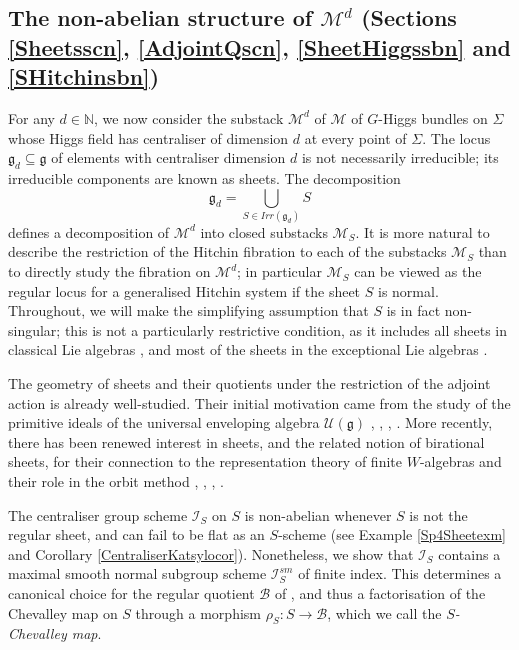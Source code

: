 \documentclass{amsart}
\theoremstyle{remark}
\numberwithin{theorem}{section}
\numberwithin{equation}{section}
\begin{document}
\subsection*{The non-abelian structure of \texorpdfstring{$\mathcal M^d$}{Md} (Sections \ref{Sheetsscn}, \ref{AdjointQscn}, \ref{SheetHiggssbn} and \ref{SHitchinsbn})} 
For any $d \in \mathbb{N}$, we now consider the substack $\mathcal M^d$ of $\mathcal M$ of $G$-Higgs bundles on $\Sigma$ whose Higgs field has centraliser of dimension $d$ at every point of $\Sigma$. The locus $\mathfrak{g}_d \subseteq \mathfrak{g}$ of elements with centraliser dimension $d$ is not necessarily irreducible; its irreducible components are known as sheets. The decomposition $$\mathfrak{g}_d = \bigcup_{S \in Irr(\mathfrak{g}_d)}S$$ defines a decomposition of $\mathcal M^d$ into closed substacks $\mathcal M_S$. It is more natural to describe the restriction of the Hitchin fibration to each of the substacks $\mathcal M_S$ than to directly study the fibration on $\mathcal M^d$; in particular $\mathcal M_S$ can be viewed as the regular locus for a generalised Hitchin system if the sheet $S$ is normal. Throughout, we will make the simplifying assumption that $S$ is in fact non-singular; this is not a particularly restrictive condition, as it includes all sheets in classical Lie algebras \cite{ImHof}, and most of the sheets in the exceptional Lie algebras \cite{Bulois}.

The geometry of sheets and their quotients under the restriction of the adjoint action is already well-studied. Their initial motivation came from the study of the primitive ideals of the universal enveloping algebra $\mathcal U(\mathfrak{g})$ \cite{Dixmier4}, \cite{BJ}, \cite{Borho1}, \cite{BK}. More recently, there has been renewed interest in sheets, and the related notion of birational sheets, for their connection to the representation theory of finite $W$-algebras and their role in the orbit method \cite{Premet3}, \cite{PT}, \cite{Losev4}, \cite{Topley}.

The centraliser group scheme $\mathcal I_S$ on $S$ is non-abelian whenever $S$ is not the regular sheet, and can fail to be flat as an $S$-scheme (see Example \ref{Sp4Sheetexm} and Corollary \ref{CentraliserKatsylocor}). Nonetheless, we show that $\mathcal I_S$ contains a maximal smooth normal subgroup scheme $\mathcal I_S^{sm}$ of finite index. This determines a canonical choice for the regular quotient $\mathcal B$ of \cite{Ngo3}, and thus a factorisation of the Chevalley map on $S$ through a morphism $\rho_S:S \rightarrow \mathcal B$, which we call the \emph{$S$-Chevalley map}.
\end{document}

